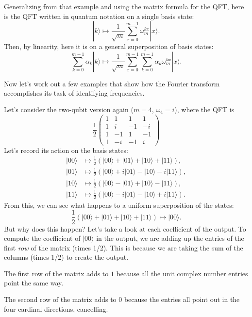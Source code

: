 \documentclass{article}
\theoremstyle{plain}
\theoremstyle{definition}
\theoremstyle{remark}
\numberwithin{theorem}{section}
\begin{document}
Generalizing from that example and using the matrix formula for the QFT, here is the QFT written in quantum notation on a single basis state:
\[
	|k \rangle
	\mapsto
	\frac{1}{\sqrt{m}} \sum_{x=0}^{m-1} \omega_m^{kx} |x \rangle.
\]
Then, by linearity, here it is on a general superposition of basis states:
\[
	\sum_{k=0}^{m-1} \alpha_k |k \rangle
	\mapsto
	\frac{1}{\sqrt{m}}\sum_{x=0}^{m-1} \sum_{k=0}^{m-1} \alpha_k \omega_m^{kx} |x \rangle.
\]

Now let's work out a few examples that show how the Fourier transform accomplishes its task of identifying frequencies.



Let's consider the two-qubit version again ($m=4$, $\omega_4 = i$), where the QFT is
\[
\frac{1}{2}
\begin{pmatrix}
1 & 1 & 1 & 1\\
1 & i & -1 & -i \\
1 & -1 & 1 & -1 \\
1 & -i & -1 & i
\end{pmatrix}
\]
Let's record its action on the basis states:
\begin{align*}
|00\rangle &\mapsto \frac{1}{2} \left( |00\rangle + |01 \rangle + |10 \rangle + |11 \rangle \right), \\
|01\rangle &\mapsto \frac{1}{2} \left( |00\rangle + i |01 \rangle - |10 \rangle -i |11 \rangle \right), \\
|10\rangle &\mapsto \frac{1}{2} \left( |00\rangle - |01 \rangle + |10 \rangle - |11 \rangle \right), \\
|11\rangle &\mapsto\frac{1}{2} \left(  |00\rangle -i |01 \rangle - |10 \rangle + i|11 \rangle \right).
\end{align*}
From this, we can see what happens to a uniform superposition of the states:
\[
\frac{1}{2} \left( |00\rangle + |01 \rangle + |10 \rangle + |11 \rangle  \right) \mapsto
|00\rangle.
\]
But why does this happen?  Let's take a look at each coefficient of the output.  To compute the coefficient of $|00\rangle$ in the output, we are adding up the entries of the first \emph{row} of the matrix (times 1/2).  This is because we are taking the sum of the columns (times 1/2) to create the output.

The first row of the matrix adds to $1$ because all the unit complex number entries point the same way.

The second row of the matrix adds to $0$ because the entries all point out in the four cardinal directions, cancelling.
\end{document}

